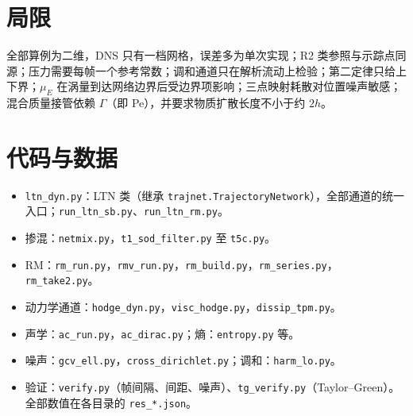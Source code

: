 \documentclass[11pt,a4paper]{article}
\begin{document}
\section{局限}
全部算例为二维，DNS 只有一档网格，误差多为单次实现；R2 类参照与示踪点同源；压力需要每帧一个参考常数；调和通道只在解析流动上检验；第二定律只给上下界；$\mu_E$ 在涡量到达网络边界后受边界项影响；三点映射耗散对位置噪声敏感；混合质量接管依赖 $\Gamma$（即 Pe），并要求物质扩散长度不小于约 $2h$。

\appendix
\section{代码与数据}
\begin{itemize}
\item \texttt{ltn\_dyn.py}：LTN 类（继承 \texttt{trajnet.TrajectoryNetwork}），全部通道的统一入口；\texttt{run\_ltn\_sb.py}、\texttt{run\_ltn\_rm.py}。
\item 掺混：\texttt{netmix.py}，\texttt{t1\_sod\_filter.py} 至 \texttt{t5c.py}。
\item RM：\texttt{rm\_run.py}，\texttt{rmv\_run.py}，\texttt{rm\_build.py}，\texttt{rm\_series.py}，\texttt{rm\_take2.py}。
\item 动力学通道：\texttt{hodge\_dyn.py}，\texttt{visc\_hodge.py}，\texttt{dissip\_tpm.py}。
\item 声学：\texttt{ac\_run.py}，\texttt{ac\_dirac.py}；熵：\texttt{entropy.py} 等。
\item 噪声：\texttt{gcv\_ell.py}，\texttt{cross\_dirichlet.py}；调和：\texttt{harm\_lo.py}。
\item 验证：\texttt{verify.py}（帧间隔、间距、噪声）、\texttt{tg\_verify.py}（Taylor–Green）。全部数值在各目录的 \texttt{res\_*.json}。
\end{itemize}
\end{document}
